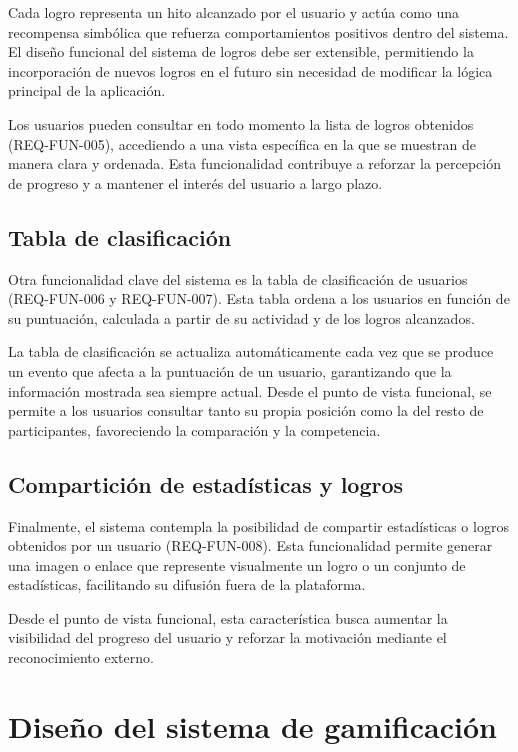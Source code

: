 Cada logro representa un hito alcanzado por el usuario y actúa como una recompensa simbólica que refuerza comportamientos positivos dentro del sistema. El diseño funcional del sistema de logros debe ser extensible, permitiendo la incorporación de nuevos logros en el futuro sin necesidad de modificar la lógica principal de la aplicación.

Los usuarios pueden consultar en todo momento la lista de logros obtenidos (REQ-FUN-005), accediendo a una vista específica en la que se muestran de manera clara y ordenada. Esta funcionalidad contribuye a reforzar la percepción de progreso y a mantener el interés del usuario a largo plazo.

\subsection{Tabla de clasificación}

Otra funcionalidad clave del sistema es la tabla de clasificación de usuarios (REQ-FUN-006 y REQ-FUN-007). Esta tabla ordena a los usuarios en función de su puntuación, calculada a partir de su actividad y de los logros alcanzados.

La tabla de clasificación se actualiza automáticamente cada vez que se produce un evento que afecta a la puntuación de un usuario, garantizando que la información mostrada sea siempre actual. Desde el punto de vista funcional, se permite a los usuarios consultar tanto su propia posición como la del resto de participantes, favoreciendo la comparación y la competencia.

\subsection{Compartición de estadísticas y logros}

Finalmente, el sistema contempla la posibilidad de compartir estadísticas o logros obtenidos por un usuario (REQ-FUN-008). Esta funcionalidad permite generar una imagen o enlace que represente visualmente un logro o un conjunto de estadísticas, facilitando su difusión fuera de la plataforma.

Desde el punto de vista funcional, esta característica busca aumentar la visibilidad del progreso del usuario y reforzar la motivación mediante el reconocimiento externo.

\section{Diseño del sistema de gamificación}

